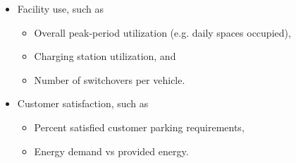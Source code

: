 \documentclass[11pt]{scrartcl}
\begin{document}
\begin{itemize}
\item Facility use, such as
\begin{itemize}
 \item Overall peak-period utilization (e.g. daily spaces occupied),
 \item Charging station utilization, and
 \item Number of switchovers per vehicle.
\end{itemize}
\item Customer satisfaction, such as
\begin{itemize}
 \item Percent satisfied customer parking requirements,
 \item Energy demand vs provided energy.
\end{itemize}
\end{itemize}
\end{document}
